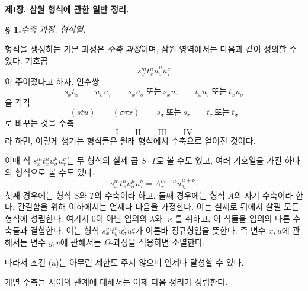 \begin{center}
{\Large\bfseries 제I장. \quad 삼원 형식에 관한 일반 정리.}
\end{center}

\begin{center}
\textbf{§ 1.}\quad \emph{수축 과정. 형식열.}
\end{center}

형식을 생성하는 기본 과정은 \emph{수축 과정}이며, 삼원 영역에서는 다음과 같이 정의할 수 있다. 기호곱
\[
s_x^m t_x^n u_\sigma^\mu u_\tau^\nu
\]
이 주어졌다고 하자. 인수쌍
\[
s_xt_x\qquad u_\sigma u_\tau\qquad s_xu_\sigma\ \text{또는}\ s_xu_\tau
\qquad t_xu_\tau\ \text{또는}\ t_xu_\sigma
\]
을 각각
\[
(stu)\qquad (\sigma\tau x)\qquad s_\sigma\ \text{또는}\ s_\tau
\qquad t_\tau\ \text{또는}\ t_\sigma
\]
로 바꾸는 것을 수축
\[
\text{I}\qquad\text{II}\qquad\text{III}\qquad\text{IV}
\]
라 하면, 이렇게 생기는 형식들은 원래 형식에서 수축으로 얻어진 것이다.

이때 식 $s_x^m t_x^n u_\sigma^\mu u_\tau^\nu$는 두 형식의 실제 곱 $S\cdot T$로 볼 수도 있고, 여러 기호열을 가진 하나의 형식으로 볼 수도 있다.
\[
s_x^m t_x^n u_\sigma^\mu u_\tau^\nu=A_x^{m+n}u_\lambda^{\mu+\nu}.
\]
첫째 경우에는 형식 $S$와 $T$의 수축이라 하고, 둘째 경우에는 \glqq{}형식 $A$의 자기 수축\grqq{}이라 한다. 간결함을 위해 이하에서는 언제나 다음을 가정한다. 이는 실제로 뒤에서 살필 모든 형식에 성립한다.
여기서 0이 아닌 임의의 $\lambda$와 $\varkappa$를 취하고, 이 식들을 임의의 다른 수축들과 결합한다. 이는 형식 $s_x^m t_y^n u_\sigma^\mu u_\tau^\nu$가 이른바 \glqq{}정규형\grqq{}임을 뜻한다. 즉 변수 $x,u$에 관해서든 변수 $y,v$에 관해서든 $\Omega$-과정을 적용하면 소멸한다.

따라서 조건 (a)는 아무런 제한도 주지 않으며 언제나 달성할 수 있다.

개별 수축들 사이의 관계에 대해서는 이제 다음 정리가 성립한다.

